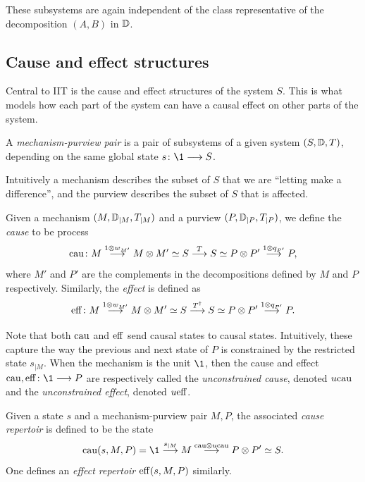 \begin{remark}
    These subsystems are again independent of the class representative of the decomposition $(A,B)$ in $\mathbb{D}$. 
\end{remark}




\subsection{Cause and effect structures}

Central to IIT is the cause and effect structures of the system $S$. This is what models how each part of the system can have a causal effect on other parts of the system. 

\begin{definition}
    A \emph{mechanism-purview pair} is a pair of subsystems of a given system $(S, \mathbb{D}, T)$, depending on the same global state $s\: \1 \to S$.    
\end{definition}

Intuitively a mechanism describes the subset of $S$ that we are ``letting make a difference'', and the purview describes the subset of $S$ that is affected. 

\begin{definition}
    Given a mechanism $(M, \mathbb{D}_{\mid M}, T_{\mid M})$ and a purview $(P,\mathbb{D}_{\mid P}, T_{\mid P})$, we define the \emph{cause} to be process 
    $$\mathrm{cau}\colon M \overset{1\otimes w_{M'}}{\longrightarrow} M\otimes M' \simeq S \overset{T}{\longrightarrow} S \simeq P\otimes P' \overset{1\otimes q_{P'}}{\longrightarrow} P,$$
    where $M'$ and $P'$ are the complements in the decompositions defined by $M$ and $P$ respectively. Similarly, the \emph{effect} is defined as
    $$\mathrm{eff}\colon M \overset{1\otimes w_{M'}}{\longrightarrow} M\otimes M' \simeq S \overset{T^\dagger}{\longrightarrow} S \simeq P\otimes P' \overset{1\otimes q_{P'}}{\longrightarrow} P.$$
\end{definition}

Note that both $\mathrm{cau}$ and $\mathrm{eff}$ send causal states to causal states. Intuitively, these capture the way the previous and next state of $P$ is constrained by the restricted state $s_{\mid M}$.  When the mechanism is the unit $\1$, then the cause and effect $\cau, \eff\: \1\to P$ are respectively called the \emph{unconstrained cause}, denoted $u\mathrm{cau}$ and the \emph{unconstrained effect}, denoted $u\mathrm{eff}$. 

\begin{definition}
    Given a state $s$ and a mechanism-purview pair $M,P$, the associated \emph{cause repertoir} is defined to be the state 
    $$\cau(s,M,P) = \1\overset{s_{\mid M}}\to M \overset{\cau\otimes u\cau}\to P\otimes P' \simeq S.$$
    One defines an \emph{effect repertoir} $\mathrm{eff}(s,M,P)$ similarly. 
\end{definition}

